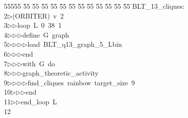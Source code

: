 %
%
\begin{tabbing}
55555 \= 55 \= 55 \= 55 \= 55 \= 55 \= 55 \= 55 \= 55 \= 55 \= 55 \= 55 \= 55 \= \>BLT\_13\_cliques:\\[0pt]
2\>$\triangleright$\>(ORBITER)\ v\ 2\ \\[0pt]
3\>$\triangleright$\>$\triangleright$\>loop\ L\ 0\ 38\ 1\ \\[0pt]
4\>$\triangleright$\>$\triangleright$\>$\triangleright$\>define\ G\ graph\ \\[0pt]
5\>$\triangleright$\>$\triangleright$\>$\triangleright$\>$\triangleright$\>load\ BLT\_q13\_graph\_5\_Lbin\ \\[0pt]
6\>$\triangleright$\>$\triangleright$\>$\triangleright$\>end\ \\[0pt]
7\>$\triangleright$\>$\triangleright$\>$\triangleright$\>with\ G\ do\ \\[0pt]
8\>$\triangleright$\>$\triangleright$\>$\triangleright$\>graph\_theoretic\_activity\ \\[0pt]
9\>$\triangleright$\>$\triangleright$\>$\triangleright$\>$\triangleright$\>find\_cliques\ rainbow\ target\_size\ 9\ \\[0pt]
10\>$\triangleright$\>$\triangleright$\>$\triangleright$\>end\ \\[0pt]
11\>$\triangleright$\>$\triangleright$\>end\_loop\ L\\[0pt]
12\>\end{tabbing}
